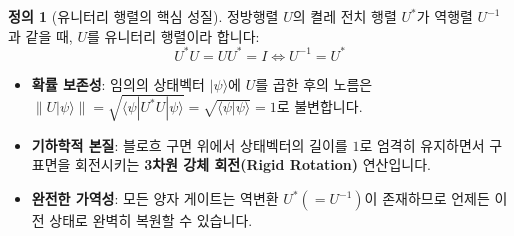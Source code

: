 \documentclass[11pt, a4paper]{article}
\newcommand{\ket}[1]{|#1\rangle}
\newcommand{\bra}[1]{\langle#1|}
\newcommand{\braket}[2]{\langle#1|#2\rangle}
\theoremstyle{definition}
\newtheorem{definition}{정의}[section]
\begin{document}
\begin{definition}[유니터리 행렬의 핵심 성질]
정방행렬 $U$의 켤레 전치 행렬 $U^*$가 역행렬 $U^{-1}$과 같을 때, $U$를 유니터리 행렬이라 합니다:
$$U^* U = U U^* = I \iff U^{-1} = U^*$$
\begin{itemize}
    \item \textbf{확률 보존성}: 임의의 상태벡터 $\ket{\psi}$에 $U$를 곱한 후의 노름은 $\|U\ket{\psi}\| = \sqrt{\bra{\psi}U^* U\ket{\psi}} = \sqrt{\braket{\psi}{\psi}} = 1$로 불변합니다.
    \item \textbf{기하학적 본질}: 블로흐 구면 위에서 상태벡터의 길이를 $1$로 엄격히 유지하면서 구 표면을 회전시키는 \textbf{3차원 강체 회전(Rigid Rotation)} 연산입니다.
    \item \textbf{완전한 가역성}: 모든 양자 게이트는 역변환 $U^*(=U^{-1})$이 존재하므로 언제든 이전 상태로 완벽히 복원할 수 있습니다.
\end{itemize}
\end{definition}
\end{document}
